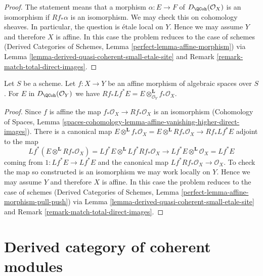 \begin{proof}
The statement means that a morphism $\alpha : E \to F$ of
$D_\QCoh(\mathcal{O}_X)$ is an isomorphism if
$Rf_*\alpha$ is an isomorphism. We may check this on cohomology sheaves.
In particular, the question is \'etale local on $Y$. Hence we may assume
$Y$ and therefore $X$ is affine. In this case the problem reduces to the
case of schemes
(Derived Categories of Schemes, Lemma \ref{perfect-lemma-affine-morphism})
via Lemma \ref{lemma-derived-quasi-coherent-small-etale-site} and
Remark \ref{remark-match-total-direct-images}.
\end{proof}

\begin{lemma}
\label{lemma-affine-morphism-pull-push}
Let $S$ be a scheme. Let $f : X \to Y$ be an affine morphism of algebraic
spaces over $S$. For $E$ in $D_\QCoh(\mathcal{O}_Y)$ we have
$Rf_* Lf^* E = E \otimes^\mathbf{L}_{\mathcal{O}_Y} f_*\mathcal{O}_X$.
\end{lemma}

\begin{proof}
Since $f$ is affine the map $f_*\mathcal{O}_X \to Rf_*\mathcal{O}_X$
is an isomorphism (Cohomology of Spaces, Lemma
\ref{spaces-cohomology-lemma-affine-vanishing-higher-direct-images}).
There is a canonical map
$E \otimes^\mathbf{L} f_*\mathcal{O}_X =
E \otimes^\mathbf{L} Rf_*\mathcal{O}_X \to Rf_* Lf^* E$
adjoint to the map
$$
Lf^*(E \otimes^\mathbf{L} Rf_*\mathcal{O}_X) =
Lf^*E \otimes^\mathbf{L} Lf^*Rf_*\mathcal{O}_X \longrightarrow
Lf^* E \otimes^\mathbf{L} \mathcal{O}_X = Lf^* E
$$
coming from $1 : Lf^*E \to Lf^*E$ and the canonical map
$Lf^*Rf_*\mathcal{O}_X \to \mathcal{O}_X$. To check the map so constructed
is an isomorphism we may work locally on $Y$. Hence we may assume
$Y$ and therefore $X$ is affine. In this case the problem reduces to the
case of schemes
(Derived Categories of Schemes, Lemma
\ref{perfect-lemma-affine-morphism-pull-push})
via Lemma \ref{lemma-derived-quasi-coherent-small-etale-site} and
Remark \ref{remark-match-total-direct-images}.
\end{proof}






\section{Derived category of coherent modules}
\label{section-derived-coherent}

